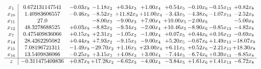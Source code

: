 \documentclass[9pt]{article}
\begin{document}
\[\begin{array}{c| c c@{\hskip 2pt} c@{\hskip 2pt} c@{\hskip 2pt} c@{\hskip 2pt} c@{\hskip 2pt} c@{\hskip 2pt} c@{\hskip 2pt} c@{\hskip 2pt} }
 x_{1}   &  0.672131147541 & -0.03 x_{9} & -1.18 x_{2} & +  0.34 x_{3} & +  1.00 x_{4} & +  0.54 x_{5} & -0.10 x_{6} & -0.15 x_{13} & +  0.82 x_{8}\\
 x_{10}   &  1.40983606557 & -0.46 x_{9} & -8.52 x_{2} & + 11.82 x_{3} & + 11.00 x_{4} & -3.43 x_{5} & -4.38 x_{6} & -1.07 x_{13} & -2.52 x_{8}\\
 x_{11}   &  27.0  &   & -8.00 x_{2} & -9.00 x_{3} & +  7.00 x_{4} & + 10.00 x_{5} & -2.00 x_{6} &   & -5.00 x_{8}\\
 x_{12}   &  48.3278688525 & +  0.03 x_{9} & -8.82 x_{2} & -9.34 x_{3} & -2.00 x_{4} & + 10.46 x_{5} & -8.90 x_{6} & -0.85 x_{13} & -4.82 x_{8}\\
 x_{7}   &  0.475409836066 & +  0.15 x_{9} & +  2.31 x_{2} & -1.05 x_{3} & -1.00 x_{4} & +  0.07 x_{5} & +  0.44 x_{6} & +  0.16 x_{13} & -0.69 x_{8}\\
 x_{14}   &  28.4262295082 & +  0.44 x_{9} & +  7.93 x_{2} & -9.15 x_{3} & -9.00 x_{4} & +  5.20 x_{5} & -0.67 x_{6} & +  1.49 x_{13} & -18.07 x_{8}\\
 x_{15}   &  7.08196721311 & -1.49 x_{9} & -29.70 x_{2} & +  1.16 x_{3} & + 23.00 x_{4} & +  6.11 x_{5} & +  0.52 x_{6} & -2.21 x_{13} & + 18.30 x_{8}\\
 x_{16}   &  13.5409836066 & -0.25 x_{9} & +  3.15 x_{2} & +  4.08 x_{3} & +  3.00 x_{4} & -7.44 x_{5} & -6.74 x_{6} & +  0.39 x_{13} & -6.85 x_{8}\\
\hline
z    &  -0.311475409836 & +  0.87 x_{9} & + 17.28 x_{2} & -6.62 x_{3} & -4.00 x_{4} & -3.84 x_{5} & +  1.61 x_{6} & +  1.41 x_{13} & -6.72 x_{8}\\
\end{array}\]
\end{document}
